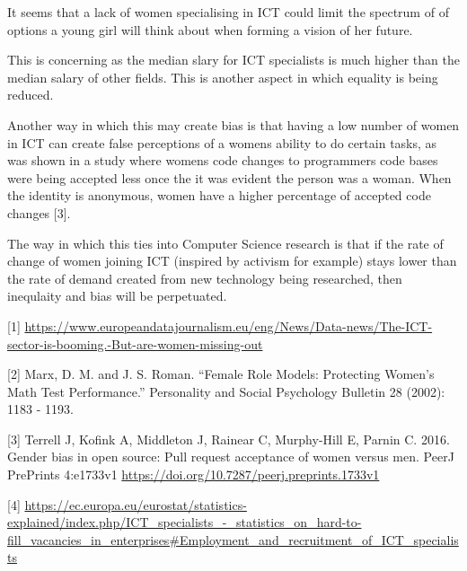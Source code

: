 \documentclass[11pt]{article}
\begin{document}
It seems that a lack of women specialising in ICT could limit the spectrum of
of options a young girl will think about when forming a vision of her future.   

This is concerning as the median slary for ICT specialists is much higher than
the median salary of other fields. This is another aspect in which equality
is being reduced.  

Another way in which this may create bias is that having a low number 
of women in ICT can create false perceptions of a womens ability to do certain
tasks, as was shown in a study where womens code changes to programmers code bases
were being accepted less once the it was evident the person was a woman. When the 
identity is anonymous, women have a higher percentage of accepted code changes [3].

The way in which this ties into Computer Science research is that if the rate of change
of women joining ICT (inspired by activism for example) stays lower than the rate of demand created 
from new technology being researched, then inequlaity and bias will be perpetuated.


[1] \url{https://www.europeandatajournalism.eu/eng/News/Data-news/The-ICT-sector-is-booming.-But-are-women-missing-out}   

[2] Marx, D. M. and J. S. Roman. “Female Role Models: Protecting Women’s Math Test Performance.” Personality and Social Psychology Bulletin 28 (2002): 1183 - 1193.   

[3] Terrell J, Kofink A, Middleton J, Rainear C, Murphy-Hill E, Parnin C. 2016. Gender bias in open source: Pull request acceptance of women versus men. PeerJ PrePrints 4:e1733v1 \url{https://doi.org/10.7287/peerj.preprints.1733v1}   

[4] \url{https://ec.europa.eu/eurostat/statistics-explained/index.php/ICT\_specialists\_-\_statistics\_on\_hard-to-fill\_vacancies\_in\_enterprises\#Employment\_and\_recruitment\_of\_ICT\_specialists}   
\end{document}
